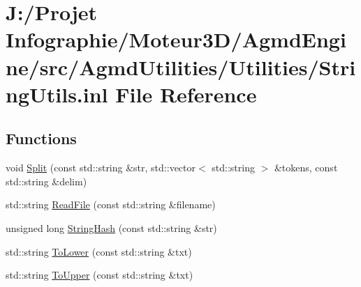 \hypertarget{_string_utils_8inl}{\section{J\-:/\-Projet Infographie/\-Moteur3\-D/\-Agmd\-Engine/src/\-Agmd\-Utilities/\-Utilities/\-String\-Utils.inl File Reference}
\label{_string_utils_8inl}
}
\subsection*{Functions}
\begin{DoxyCompactItemize}
\item 
void \hyperlink{_string_utils_8inl_a268fa4d1bb6c9c7428ffd74c25831a25}{Split} (const std\-::string \&str, std\-::vector$<$ std\-::string $>$ \&tokens, const std\-::string \&delim)
\item 
std\-::string \hyperlink{_string_utils_8inl_a49e72d1f8eb4859f7ec8c45b15cce1c8}{Read\-File} (const std\-::string \&filename)
\item 
unsigned long \hyperlink{_string_utils_8inl_ab202cf4240041e664d48851f446680e4}{String\-Hash} (const std\-::string \&str)
\item 
std\-::string \hyperlink{_string_utils_8inl_a40652f9e667c7ecd6ce070e838105e0f}{To\-Lower} (const std\-::string \&txt)
\item 
std\-::string \hyperlink{_string_utils_8inl_ac2cf815ac75553477df390e8dba42032}{To\-Upper} (const std\-::string \&txt)
\end{DoxyCompactItemize}


